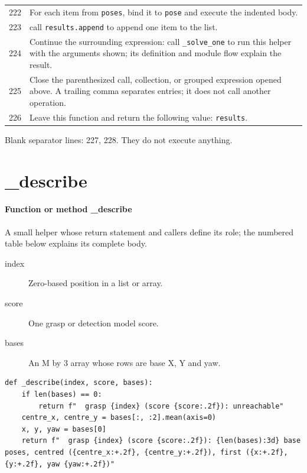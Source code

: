 \documentclass[11pt,a4paper]{book}
\begin{document}
\begin{longtable}{r p{}}
222 & For each item from \texttt{poses}, bind it to \texttt{pose} and execute the indented body. \\

223 & call \texttt{results.append} to append one item to the list. \\

224 & Continue the surrounding expression: call \texttt{\_solve\_one} to run this helper with the arguments shown; its definition and module flow explain the result. \\

225 & Close the parenthesized call, collection, or grouped expression opened above. A trailing comma separates entries; it does not call another operation. \\

226 & Leave this function and return the following value: \texttt{results}. \\

\end{longtable}

Blank separator lines: 227, 228. They do not execute anything.

\section{\_describe}

\paragraph{Function or method \_describe}
A small helper whose return statement and callers define its role; the numbered table below explains its complete body.

\begin{description}
\item[index] Zero-based position in a list or array.
\item[score] One grasp or detection model score.
\item[bases] An M by 3 array whose rows are base X, Y and yaw.
\end{description}

\begin{lstlisting}[firstnumber=229]
def _describe(index, score, bases):
    if len(bases) == 0:
        return f"  grasp {index} (score {score:.2f}): unreachable"
    centre_x, centre_y = bases[:, :2].mean(axis=0)
    x, y, yaw = bases[0]
    return f"  grasp {index} (score {score:.2f}): {len(bases):3d} base poses, centred ({centre_x:+.2f}, {centre_y:+.2f}), first ({x:+.2f}, {y:+.2f}, yaw {yaw:+.2f})"


\end{lstlisting}
\end{document}
